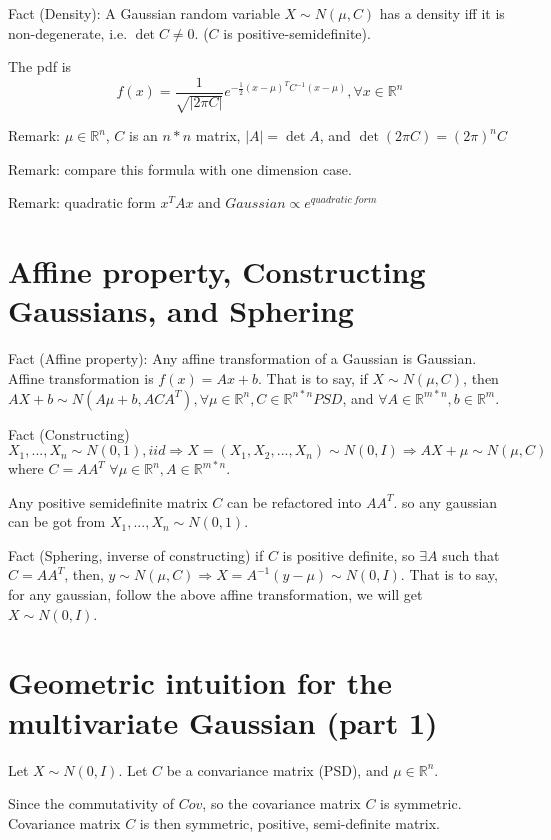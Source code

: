 \documentclass[12pt]{article}
\begin{document}
Fact (Density):
A Gaussian random variable $X\sim N(\mu, C)$
has a density iff
it is non-degenerate, i.e. $\det C \neq 0$.
($C$ is positive-semidefinite).

The pdf is
\begin{equation}
f(x)
= \frac{1}{\sqrt{|2\pi C|}}e^{-\frac{1}{2}(x-\mu)^TC^{-1}(x-\mu)},\forall x\in\mathbb{R}^n
\end{equation}

Remark: $\mu\in\mathbb{R}^n$, $C$ is an $n*n$ matrix, $|A|=\det A$, and $\det(2\pi C)=(2\pi)^n C$

Remark: compare this formula with one dimension case.

Remark: quadratic form $x^TAx$ and $Gaussian\propto e^{quadratic\ form}$

\section{Affine property, Constructing Gaussians, and Sphering}

Fact (Affine property): 
Any affine transformation of a Gaussian
is Gaussian. Affine transformation
is $f(x)=Ax+b$.
That is to say, if $X\sim N(\mu, C)$,
then $AX+b\sim N(A\mu+b, ACA^T),
\forall \mu\in\mathbb{R}^n, C\in\mathbb{R}^{n*n} PSD$,
and $\forall A\in\mathbb{R}^{m*n},b\in\mathbb{R}^m$.

Fact (Constructing) $X_1,..., X_n\sim N(0,1), iid\Rightarrow X=(X_1,X_2,...,X_n)\sim N(0,I)
\Rightarrow AX+\mu\sim N(\mu, C)$ where $C=AA^T$ $\forall \mu\in\mathbb{R}^n,A\in\mathbb{R}^{m*n}$.

Any positive semidefinite matrix $C$ can be refactored into $AA^T$.
so any gaussian can be got from $X_1,...,X_n\sim N(0,1)$.

Fact (Sphering, inverse of constructing) if $C$ is positive definite,
so $\exists A$ such that $C=AA^T$,
then,
$y\sim N(\mu, C)\Rightarrow X=A^{-1}(y-\mu)\sim N(0, I)$.
That is to say, for any gaussian, follow the above
affine transformation, we will get $X\sim N(0,I)$.

\section{Geometric intuition for the multivariate Gaussian (part 1)}

Let $X\sim N(0,I)$. Let
$C$ be a convariance matrix (PSD), and
$\mu\in\mathbb{R}^n$.

Since the commutativity of $Cov$,
so the covariance matrix $C$ is symmetric.
Covariance matrix $C$ is then
symmetric, positive, semi-definite matrix.
\end{document}
